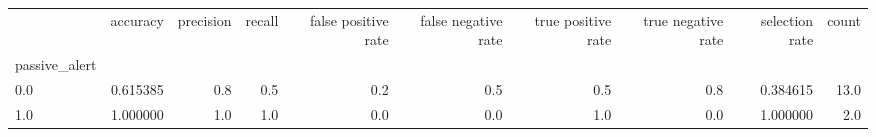\begin{tabular}{lrrrrrrrrr}
\toprule
{} &  accuracy &  precision &  recall &  false positive rate &  false negative rate &  true positive rate &  true negative rate &  selection rate &  count \\
passive\_alert &           &            &         &                      &                      &                     &                     &                 &        \\
\midrule
0.0           &  0.615385 &        0.8 &     0.5 &                  0.2 &                  0.5 &                 0.5 &                 0.8 &        0.384615 &   13.0 \\
1.0           &  1.000000 &        1.0 &     1.0 &                  0.0 &                  0.0 &                 1.0 &                 0.0 &        1.000000 &    2.0 \\
\bottomrule
\end{tabular}
